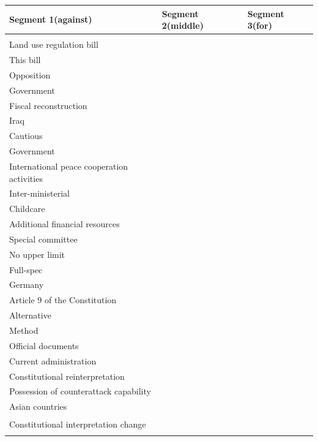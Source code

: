 \documentclass[final,5p,times,twocolumn,authoryear]{elsarticle}
\begin{document}
\begin{table}[htbp]
\centering
\renewcommand{\arraystretch}{1.5}%
\begin{tabularx}{\textwidth}{|>{\centering\arraybackslash}X|>{\centering\arraybackslash}X|>{\centering\arraybackslash}X|}
\hline
\textbf{Segment 1(against)} & \textbf{Segment 2(middle)} & \textbf{Segment 3(for)} \\ \hline
\begin{tabular}[c]{@{}l@{}}
	Hazardous waste \\ Land use regulation bill \\ This bill \\ Opposition \\ Government \\ Fiscal reconstruction \\ Iraq \\ Cautious \\ Government \\ International peace cooperation activities \\ Inter-ministerial \\ Childcare \\ Additional financial resources \\ Special committee \\ No upper limit \\ Full-spec \\ Germany \\ Article 9 of the Constitution \\ Alternative \\ Method \\ Official documents \\ Current administration \\ Constitutional reinterpretation \\ Possession of counterattack capability \\ Asian countries \\ Constitutional interpretation change
\end{tabular} 
& 
\begin{tabular}[c]{@{}l@{}}

\end{tabular}
\end{tabularx}
\end{table}
\end{document}
